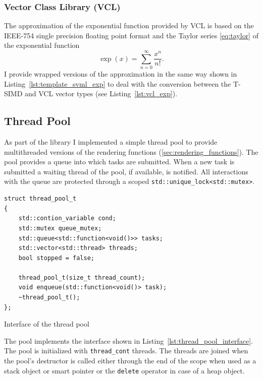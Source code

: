\documentclass[a4paper, 11pt]{memoir}
\begin{document}
    \subsubsection{Vector Class Library (VCL)}
    \label{sec:vcl}
    The approximation of the exponential function provided by VCL is based on the IEEE-754 single precision floating
    point format and the Taylor series \eqref{eq:taylor} of the exponential function
    \begin{equation}
        \exp{(x)} = \sum_{n = 0}^\infty \frac{x^n}{n!}.
    \end{equation}
    I provide wrapped versions of the approximation in
    the same way shown in Listing~\ref{lst:template_svml_exp} to deal with the conversion between the T-SIMD and VCL
    vector types (see Listing~\ref{lst:vcl_exp}).

    \subsection{Thread Pool}
    \label{sec:thread_pool}
    As part of the library I implemented a simple thread pool to provide multithreaded versions of the rendering
    functions (\ref{sec:rendering_functions}). The pool provides a queue into which tasks are submitted. When a new task
    is submitted a waiting thread of the pool, if available, is notified. All interactions with the queue are protected
    through a scoped \texttt{std::unique_lock<std::mutex>}.

    \begin{listing}[H]
        \begin{verbatim}
struct thread_pool_t
{
    std::contion_variable cond;
    std::mutex queue_mutex;
    std::queue<std::function<void()>> tasks;
    std::vector<std::thread> threads;
    bool stopped = false;

    thread_pool_t(size_t thread_count);
    void enqueue(std::function<void()> task);
    ~thread_pool_t();
};
        \end{verbatim}
        \caption{Interface of the thread pool}
        \label{lst:thread_pool_interface}
    \end{listing}

    The pool implements the interface shown in Listing~\ref{lst:thread_pool_interface}.
    The pool is initialized with \texttt{thread_cont} threads. The threads are joined when the pool's
    destructor is called either through the end of the scope when used as a stack object or smart pointer or the
    \texttt{delete} operator in case of a heap object.
\end{document}
